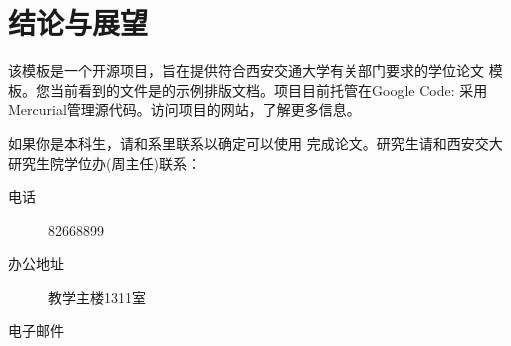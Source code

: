 \section{结论与展望}

该模板是一个开源项目，旨在提供符合西安交通大学有关部门要求的学位论文 模板。您当前看到的文件是的示例排版文档。项目目前托管在Google Code:  采用Mercurial管理源代码。访问项目的网站，了解更多信息。

如果你是本科生，请和系里联系以确定可以使用 完成论文。研究生请和西安交大研究生院学位办(周主任)联系：
        
 \begin{description}
 \item[电话] 82668899
 \item[办公地址] 教学主楼1311室
\item[电子邮件]
 \end{description}
